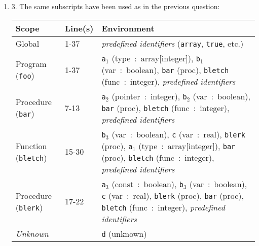 \documentclass[a4paper]{article}
\begin{document}
\begin{enumerate}
		\item 3. The same subscripts have been used as in the previous question:
		
		\begin{center}
			\begin{tabular}{| l | l |p{8.61405cm}|}
				\hline
				\textbf{Scope} & \textbf{Line(s)} & \textbf{Environment} \\ \hline
				Global & 1-37 & \textit{predefined identifiers} (\verb=array=, \verb=true=, etc.) \\ \hline
				\quad Program (\verb=foo=) & 1-37 & \verb=a=$_1$ (type~:~array[integer]), \verb=b=$_1$ (var~:~boolean), \verb=bar= (proc), \verb=bletch= (func~:~integer), \textit{predefined identifiers} \\ \hline
				\quad \quad Procedure (\verb=bar=) & 7-13 & \verb=a=$_2$ (pointer~:~integer), \verb=b=$_2$ (var~:~boolean), \verb=bar= (proc), \verb=bletch= (func~:~integer), \textit{predefined identifiers} \\ \hline
				\quad \quad Function (\verb=bletch=) & 15-30 & \verb=b=$_3$ (var~:~boolean), \verb=c= (var~:~real), \verb=blerk= (proc), \verb=a=$_1$ (type~:~array[integer]), \verb=bar= (proc), \verb=bletch= (func~:~integer), \textit{predefined identifiers} \\ \hline
				\quad \quad \quad Procedure (\verb=blerk=) & 17-22 & \verb=a=$_3$ (const~:~boolean), \verb=b=$_3$ (var~:~boolean), \verb=c= (var~:~real), \verb=blerk= (proc), \verb=bar= (proc), \verb=bletch= (func~:~integer), \textit{predefined identifiers} \\ \hline
				\textit{Unknown} & & \verb=d= (unknown) \\ \hline
			\end{tabular}
		\end{center}
		

\end{enumerate}
\end{document}
